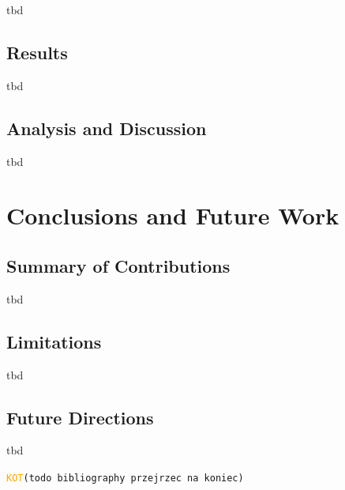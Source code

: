 \documentclass[shortabstract, mgr, english]{iithesis}
\newcommand{\DEBUG}[1]{{#1}} %
\newcommand{\KOT}[1]{\DEBUG{\tt{\textcolor{orange}{KOT}(}{#1}{)}}}
\begin{document}
tbd

\section{Results}
\label{sec:dpo-results}

tbd

\section{Analysis and Discussion}
\label{sec:dpo-discussion}

tbd



\chapter{Conclusions and Future Work}
\label{ch:conclusions}


\section{Summary of Contributions}
\label{sec:conc-contributions}

tbd

\section{Limitations}
\label{sec:conc-limitations}

tbd

\section{Future Directions}
\label{sec:conc-future}

tbd



\KOT{todo bibliography przejrzec na koniec}


\end{document}
